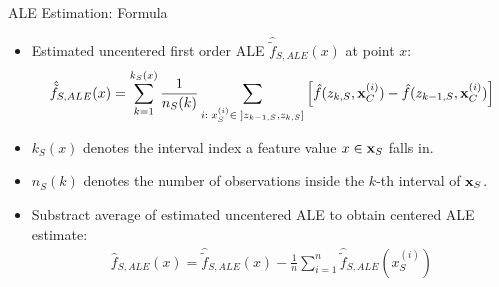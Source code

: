 \documentclass[11pt,compress,t,notes=noshow, aspectratio=169, xcolor=table]{beamer}
\begin{document}
%
%
%
%
%
%
%
%
%
%
%
%
%
%
%
%
%
%
%
%

\begin{frame}{ALE Estimation: Formula}

\begin{itemize}
\item Estimated uncentered first order ALE $\hat{\tilde{f}}_{S, ALE}(x)$ at point $x$:
$$
\begin{aligned}
\hat{\tilde{f}}_{S, ALE}(x) = \sum_{k = 1}^{k_S(x)}\frac{1}{n_S(k)}\sum_{i: \; x_S^{(i)} \in \; ]z_{k-1, S}, z_{k, S}]}\left[\fh(z_{k, S}, \xi_C) -\fh(z_{k-1, S}, \xi_C)\right]
\end{aligned}
$$
\item $k_S(x)$ denotes the interval index a feature value $x \in \xv_S$ falls in.
\item $n_S(k)$ denotes the number of observations inside the $k$-th interval of $\xv_S$.
\item Substract average of estimated uncentered ALE to obtain centered ALE estimate: %
$$
\begin{aligned}
\hat{f}_{S, ALE}(x) = \hat{\tilde{f}}_{S, ALE}(x) - \frac{1}{n}\sum_{i = 1}^n \hat{\tilde{f}}_{S, ALE}(x_S^{(i)})
\end{aligned}
$$

\end{itemize}
\end{frame}
\end{document}
